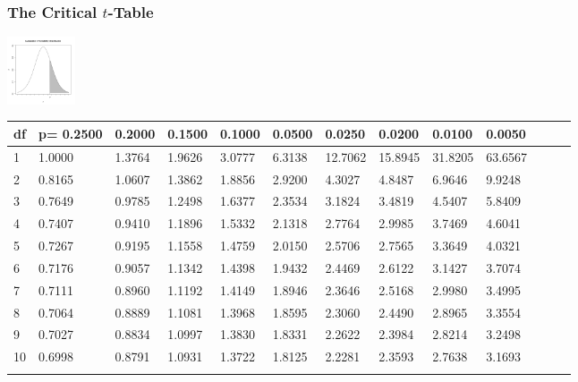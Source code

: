 \begin{frame}
  \frametitle{The Critical $t$-Table}
  \vspace*{-5em}
  \hfill\includegraphics[width=2cm]{img/tcummulativeDist}~~~~~~~~~~~~~~

  {
\fontsize{5pt}{5pt}
\selectfont
\begin{tabular}{l|llllllllllll} 
df  & p= 0.2500  &  0.2000  &  0.1500  &  0.1000  &  0.0500  &  0.0250  &  0.0200  &  0.0100  &  0.0050    \\\hline 
  1 & 1.0000 & 1.3764 & 1.9626 & 3.0777 & 6.3138 & 12.7062 & 15.8945 & 31.8205 & 63.6567  \\[5pt] \arrayrulecolor{light-gray}\hline\arrayrulecolor{black}  
  2 & 0.8165 & 1.0607 & 1.3862 & 1.8856 & 2.9200 & 4.3027 & 4.8487 & 6.9646 & 9.9248  \\[5pt] \arrayrulecolor{light-gray}\hline\arrayrulecolor{black}  
  3 & 0.7649 & 0.9785 & 1.2498 & 1.6377 & 2.3534 & 3.1824 & 3.4819 & 4.5407 & 5.8409  \\[5pt] \arrayrulecolor{light-gray}\hline\arrayrulecolor{black}  
  4 & 0.7407 & 0.9410 & 1.1896 & 1.5332 & 2.1318 & 2.7764 & 2.9985 & 3.7469 & 4.6041  \\[12pt] \arrayrulecolor{light-gray}\hline\arrayrulecolor{black}  
  5 & 0.7267 & 0.9195 & 1.1558 & 1.4759 & 2.0150 & 2.5706 & 2.7565 & 3.3649 & 4.0321  \\[5pt] \arrayrulecolor{light-gray}\hline\arrayrulecolor{black}  
  6 & 0.7176 & 0.9057 & 1.1342 & 1.4398 & 1.9432 & 2.4469 & 2.6122 & 3.1427 & 3.7074  \\[5pt] \arrayrulecolor{light-gray}\hline\arrayrulecolor{black}  
  7 & 0.7111 & 0.8960 & 1.1192 & 1.4149 & 1.8946 & 2.3646 & 2.5168 & 2.9980 & 3.4995  \\[5pt] \arrayrulecolor{light-gray}\hline\arrayrulecolor{black}  
  8 & 0.7064 & 0.8889 & 1.1081 & 1.3968 & 1.8595 & 2.3060 & 2.4490 & 2.8965 & 3.3554  \\[5pt] \arrayrulecolor{light-gray}\hline\arrayrulecolor{black}  
  9 & 0.7027 & 0.8834 & 1.0997 & 1.3830 & 1.8331 & 2.2622 & 2.3984 & 2.8214 & 3.2498  \\[12pt] \arrayrulecolor{light-gray}\hline\arrayrulecolor{black}  
 10 & 0.6998 & 0.8791 & 1.0931 & 1.3722 & 1.8125 & 2.2281 & 2.3593 & 2.7638 & 3.1693  \\[5pt] \arrayrulecolor{light-gray}\hline\arrayrulecolor{black}  

\end{tabular}}
\end{frame}
